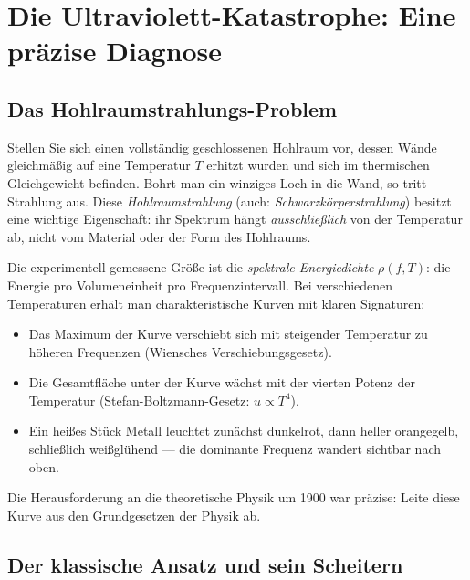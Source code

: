 \clearpage

\section{Die Ultraviolett-Katastrophe: Eine präzise Diagnose}
\label{sec:uv_catastrophe}

\subsection{Das Hohlraumstrahlungs-Problem}

Stellen Sie sich einen vollständig geschlossenen Hohlraum vor, dessen Wände gleichmäßig 
auf eine Temperatur $T$ erhitzt wurden und sich im thermischen Gleichgewicht befinden. 
Bohrt man ein winziges Loch in die Wand, so tritt Strahlung aus. Diese \emph{Hohlraumstrahlung} 
(auch: \emph{Schwarzkörperstrahlung}) besitzt eine wichtige Eigenschaft: ihr 
Spektrum hängt \emph{ausschließlich} von der Temperatur ab, nicht vom Material oder 
der Form des Hohlraums.

Die experimentell gemessene Größe ist die \emph{spektrale Energiedichte} $\rho(f, T)$: 
die Energie pro Volumeneinheit pro Frequenzintervall. Bei verschiedenen Temperaturen 
erhält man charakteristische Kurven mit klaren Signaturen:
\begin{itemize}
    \item Das Maximum der Kurve verschiebt sich mit steigender Temperatur zu höheren 
    Frequenzen (Wiensches Verschiebungsgesetz).
    \item Die Gesamtfläche unter der Kurve wächst mit der vierten Potenz der Temperatur 
    (Stefan-Boltzmann-Gesetz: $u \propto T^4$).
    \item Ein heißes Stück Metall leuchtet zunächst dunkelrot, dann heller orangegelb, 
    schließlich weißglühend — die dominante Frequenz wandert sichtbar nach oben.
\end{itemize}

Die Herausforderung an die theoretische Physik um 1900 war präzise: Leite diese Kurve 
aus den Grundgesetzen der Physik ab.

\subsection{Der klassische Ansatz und sein Scheitern}

